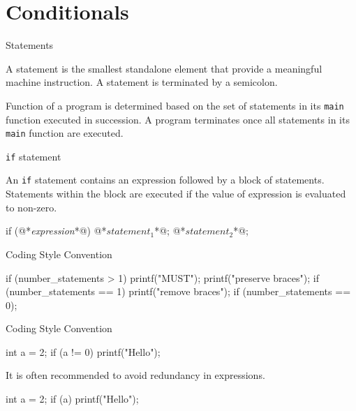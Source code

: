 \documentclass[compress]{beamer}
\begin{document}
\section{Conditionals}

\begin{slide}
	\begin{block}{Statements}

	A statement is the smallest standalone element that provide a meaningful machine instruction. A statement is terminated by a semicolon.

	Function of a program is determined based on the set of statements in its \texttt{main} function executed in succession.
	A program terminates once all statements in its \texttt{main} function are executed.

	\end{block}
\end{slide}

\begin{slide}
	\begin{block}{\texttt{if} statement}

	An \texttt{if} statement contains an expression followed by a block of statements.
	Statements within the block are executed if the value of expression is evaluated to non-zero.

	\begin{terminal}
	if (@*\textit{expression}*@) {
	    @*$\mathit{statement}_1$*@;
	    @*$\mathit{statement}_2$*@;
	}
	\end{terminal}

	\end{block}
\end{slide}

\begin{slide}
	\begin{block}{Coding Style Convention}

	\begin{terminal}
	if (number_statements > 1) {
	    printf("MUST");
	    printf("preserve braces");
	}
	if (number_statements == 1)
	    printf("remove braces");
	if (number_statements == 0);
	\end{terminal}

	\end{block}
\end{slide}

\begin{slide}
	\begin{block}{Coding Style Convention}

	\begin{terminal}
	int a = 2;
	if (a != 0)
	    printf("Hello");
	\end{terminal}

	It is often recommended to avoid redundancy in expressions.

	\begin{terminal}
	int a = 2;
	if (a)
	    printf("Hello");
	\end{terminal}

	\end{block}
\end{slide}
\end{document}
